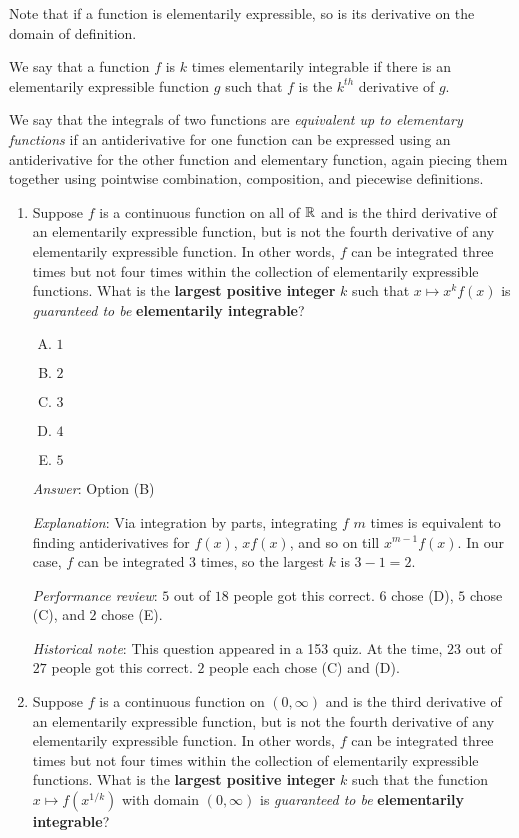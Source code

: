 \documentclass[10pt]{amsart}
\begin{document}
Note that if a function is elementarily expressible, so is its
derivative on the domain of definition.

We say that a function $f$ is $k$ times elementarily integrable if
there is an elementarily expressible function $g$ such that $f$ is the
$k^{th}$ derivative of $g$.

We say that the integrals of two functions are {\em equivalent up to
elementary functions} if an antiderivative for one function can be
expressed using an antiderivative for the other function and
elementary function, again piecing them together using pointwise
combination, composition, and piecewise definitions.

\begin{enumerate}

\item Suppose $f$ is a continuous function on all of $\mathbb{R}$ and is the
  third derivative of an elementarily expressible function, but is not
  the fourth derivative of any elementarily expressible function. In
  other words, $f$ can be integrated three times but not four times
  within the collection of elementarily expressible functions. What is
  the {\bf largest positive integer} $k$ such that $x \mapsto x^kf(x)$
  is {\em guaranteed to be} {\bf elementarily integrable}?

  \begin{enumerate}[(A)]
  \item $1$
  \item $2$
  \item $3$
  \item $4$
  \item $5$
  \end{enumerate}

  {\em Answer}: Option (B)

  {\em Explanation}: Via integration by parts, integrating $f$ $m$ times is
  equivalent to finding antiderivatives for $f(x)$, $xf(x)$, and so on
  till $x^{m-1}f(x)$. In our case, $f$ can be integrated $3$ times, so
  the largest $k$ is $3 - 1 = 2$.

  {\em Performance review}: $5$ out of $18$ people got this
  correct. $6$ chose (D), $5$ chose (C), and $2$ chose (E).

  {\em Historical note}: This question appeared in a 153 quiz. At the
  time, $23$ out of $27$ people got this correct. $2$ people each chose
  (C) and (D).

\item Suppose $f$ is a continuous function on $(0,\infty)$ and is the
  third derivative of an elementarily expressible function, but is not
  the fourth derivative of any elementarily expressible function. In
  other words, $f$ can be integrated three times but not four times
  within the collection of elementarily expressible functions. What is
  the {\bf largest positive integer} $k$ such that the function $x
  \mapsto f(x^{1/k})$ with domain $(0,\infty)$ is {\em guaranteed to
  be} {\bf elementarily integrable}?


\end{enumerate}
\end{document}
